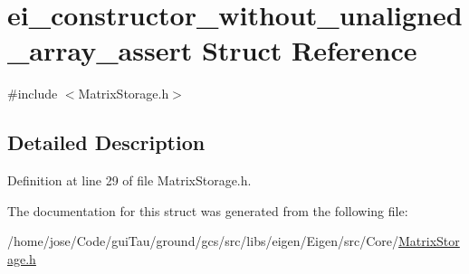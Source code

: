 \hypertarget{structei__constructor__without__unaligned__array__assert}{\section{ei\-\_\-constructor\-\_\-without\-\_\-unaligned\-\_\-array\-\_\-assert Struct Reference}
\label{structei__constructor__without__unaligned__array__assert}
}


{\ttfamily \#include $<$Matrix\-Storage.\-h$>$}



\subsection{Detailed Description}


Definition at line 29 of file Matrix\-Storage.\-h.



The documentation for this struct was generated from the following file\-:\begin{DoxyCompactItemize}
\item 
/home/jose/\-Code/gui\-Tau/ground/gcs/src/libs/eigen/\-Eigen/src/\-Core/\hyperlink{_matrix_storage_8h}{Matrix\-Storage.\-h}\end{DoxyCompactItemize}
